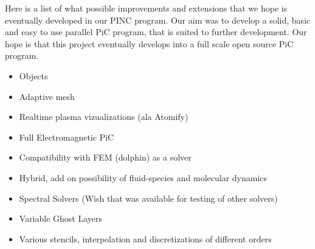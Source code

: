 Here is a list of what possible improvements and extensions that we hope
is eventually developed in our PINC program. Our aim was to develop a solid, basic
and easy to use parallel PiC program, that is suited to further development. Our hope
is that this project eventually develops into a full scale open source PiC program.

\begin{itemize}
    \item Objects
    \item Adaptive mesh
    \item Realtime plasma vizualizations (ala Atomify)
    \item Full Electromagnetic PiC
    \item Compatibility with FEM (dolphin) as a solver
    \item Hybrid, add on possibility of fluid-species and molecular dynamics
    \item Spectral Solvers (Wish that was available for testing of other solvers)
    \item Variable Ghost Layers
    \item Various stencils, interpolation and discretizations of different orders
\end{itemize}
